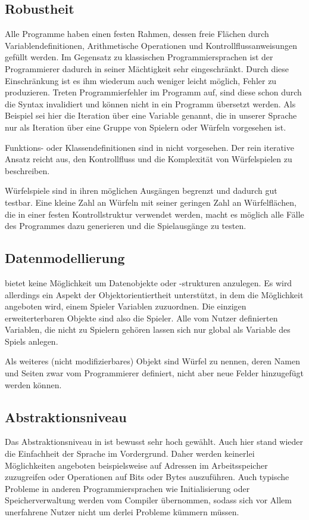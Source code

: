 	\subsection{Robustheit}
	\label{sub:robustheit}
		Alle \dg Programme haben einen festen Rahmen, dessen freie Flächen durch Variablendefinitionen, Arithmetische Operationen und Kontrollflussanweisungen gefüllt werden. Im Gegensatz zu klassischen Programmiersprachen ist der Programmierer dadurch in seiner Mächtigkeit sehr eingeschränkt. Durch diese Einschränkung ist es ihm wiederum auch weniger leicht möglich, Fehler zu produzieren. Treten Programmierfehler im \dg Programm auf, sind diese schon durch die Syntax invalidiert und können nicht in ein Programm übersetzt werden. Als Beispiel sei hier die Iteration über eine Variable genannt, die in unserer Sprache nur als Iteration über eine Gruppe von Spielern oder Würfeln vorgesehen ist. 

		Funktions- oder Klassendefinitionen sind in \dg nicht vorgesehen. Der rein iterative Ansatz reicht aus, den Kontrollfluss und die Komplexität von Würfelspielen zu beschreiben.

		Würfelspiele sind in ihren möglichen Ausgängen begrenzt und dadurch gut testbar. Eine kleine Zahl an Würfeln mit seiner geringen Zahl an Würfelflächen, die in einer festen Kontrollstruktur verwendet werden, macht es möglich alle Fälle des Programmes dazu generieren und die Spielausgänge zu testen.

	\subsection{Datenmodellierung}
	\label{sub:datenmodellierung}
		\dg bietet keine Möglichkeit um Datenobjekte oder -strukturen anzulegen. Es wird allerdings ein Aspekt der Objektorientiertheit unterstützt, in dem die Möglichkeit angeboten wird, einem Spieler Variablen zuzuordnen. Die einzigen erweiterterbaren Objekte sind also die Spieler. Alle vom Nutzer definierten Variablen, die nicht zu Spielern gehören lassen sich nur global als Variable des Spiels anlegen.

		Als weiteres (nicht modifizierbares) Objekt sind Würfel zu nennen, deren Namen und Seiten zwar vom Programmierer definiert, nicht aber neue Felder hinzugefügt werden können.

	\subsection{Abstraktionsniveau}
	\label{sub:abstraktionsniveau}
		Das Abstraktionsniveau in \dg ist bewusst sehr hoch gewählt. Auch hier stand wieder die Einfachheit der Sprache im Vordergrund. Daher werden keinerlei Möglichkeiten angeboten beispielsweise auf Adressen im Arbeitsspeicher zuzugreifen oder Operationen auf Bits oder Bytes auszuführen. Auch typische Probleme in anderen Programmiersprachen wie Initialisierung oder Speicherverwaltung werden vom Compiler übernommen, sodass sich vor Allem unerfahrene Nutzer nicht um derlei Probleme kümmern müssen.

